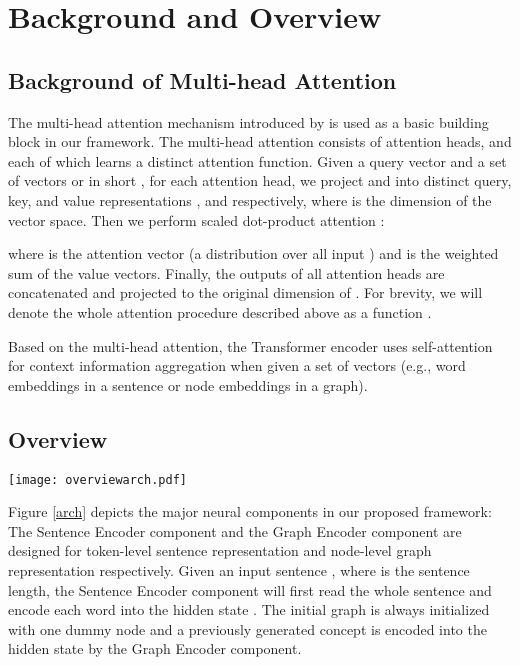 \documentclass[11pt,a4paper]{article}
\begin{document}
	\section{Background and Overview}
	\label{overview}
	\subsection{Background of Multi-head Attention}
	The multi-head attention mechanism introduced by  is used as a basic building block in our framework. The multi-head attention consists of  attention heads, and each of which learns a distinct attention function. Given a query vector  and a set of vectors  or in short , for each attention head, we project  and  into distinct query, key, and value representations ,  and  respectively, where  is the dimension of the vector space. Then we perform scaled dot-product attention \cite{vaswani2017attention}:
	
	where  is the attention vector (a distribution over all input ) and  is the weighted sum of the value vectors. Finally, the outputs of all attention heads are concatenated and projected to the original dimension of . For brevity, we will denote the whole attention procedure described above as a function .
	
	Based on the multi-head attention, the Transformer encoder \cite{vaswani2017attention} uses self-attention for context information aggregation when given a set of vectors (e.g., word embeddings in a sentence or node embeddings in a graph).
	\subsection{Overview}
	\begin{figure*}[t]
		\centering
		\texttt{[image: overviewarch.pdf]}
		\caption{Model architecture of GSP, together with the decoding procedure at the time step , where the read and write operations around the parser state  follow the order .}
		\label{arch}
	\end{figure*}
	Figure \ref{arch} depicts the major neural components in our proposed framework: The Sentence Encoder component and the Graph Encoder component are designed for token-level sentence representation and node-level graph representation respectively. Given an input sentence , where  is the sentence length, the Sentence Encoder component will first read the whole sentence and encode each word  into the hidden state . The initial graph  is always initialized with one dummy node  and a previously generated concept  is encoded into the hidden state  by the Graph Encoder component.
	
\end{document}
